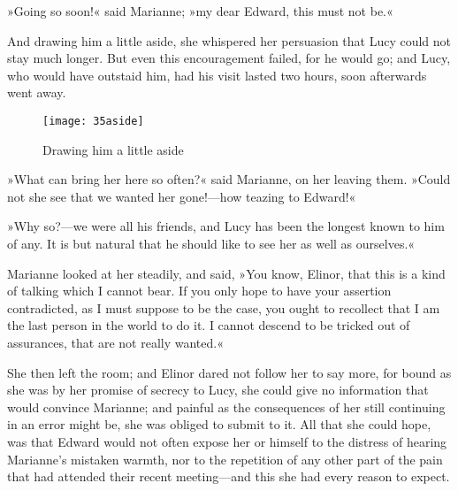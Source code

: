 »Going so soon!« said Marianne; »my dear Edward, this must not be.«

And drawing him a little aside, she whispered her persuasion that Lucy could not stay much longer. But even this encouragement failed, for he would go; and Lucy, who would have outstaid him, had his visit lasted two hours, soon afterwards went away.

\begin{figure}[tbph]
\centering
\texttt{[image: 35aside]}
\caption{Drawing him a little aside}
\end{figure}

»What can bring her here so often?« said Marianne, on her leaving them. »Could not she see that we wanted her gone!—how teazing to Edward!«

»Why so?—we were all his friends, and Lucy has been the longest known to him of any. It is but natural that he should like to see her as well as ourselves.«

Marianne looked at her steadily, and said, »You know, Elinor, that this is a kind of talking which I cannot bear. If you only hope to have your assertion contradicted, as I must suppose to be the case, you ought to recollect that I am the last person in the world to do it. I cannot descend to be tricked out of assurances, that are not really wanted.«

She then left the room; and Elinor dared not follow her to say more, for bound as she was by her promise of secrecy to Lucy, she could give no information that would convince Marianne; and painful as the consequences of her still continuing in an error might be, she was obliged to submit to it. All that she could hope, was that Edward would not often expose her or himself to the distress of hearing Marianne’s mistaken warmth, nor to the repetition of any other part of the pain that had attended their recent meeting—and this she had every reason to expect.